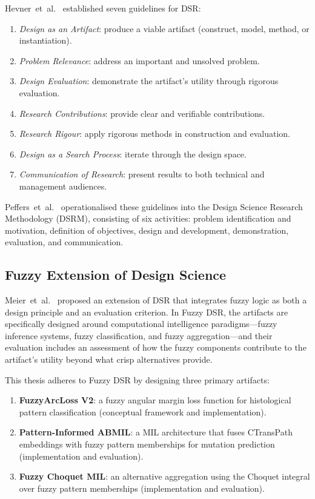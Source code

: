 Hevner~et~al.~\cite{hevner2004design} established seven guidelines for DSR:
\begin{enumerate}
    \item \textit{Design as an Artifact}: produce a viable artifact (construct, model, method, or instantiation).
    \item \textit{Problem Relevance}: address an important and unsolved problem.
    \item \textit{Design Evaluation}: demonstrate the artifact's utility through rigorous evaluation.
    \item \textit{Research Contributions}: provide clear and verifiable contributions.
    \item \textit{Research Rigour}: apply rigorous methods in construction and evaluation.
    \item \textit{Design as a Search Process}: iterate through the design space.
    \item \textit{Communication of Research}: present results to both technical and management audiences.
\end{enumerate}

Peffers~et~al.~\cite{peffers2007dsrm} operationalised these guidelines into the Design Science Research Methodology (DSRM), consisting of six activities: problem identification and motivation, definition of objectives, design and development, demonstration, evaluation, and communication.

\subsection{Fuzzy Extension of Design Science}
\label{sec:bg:fuzzy_dsr}

Meier~et~al.~\cite{meier2009fuzzy} proposed an extension of DSR that integrates fuzzy logic as both a design principle and an evaluation criterion.
In Fuzzy DSR, the artifacts are specifically designed around computational intelligence paradigms---fuzzy inference systems, fuzzy classification, and fuzzy aggregation---and their evaluation includes an assessment of how the fuzzy components contribute to the artifact's utility beyond what crisp alternatives provide.

This thesis adheres to Fuzzy DSR by designing three primary artifacts:
\begin{enumerate}
    \item \textbf{FuzzyArcLoss V2}: a fuzzy angular margin loss function for histological pattern classification (conceptual framework and implementation).
    \item \textbf{Pattern-Informed ABMIL}: a MIL architecture that fuses CTransPath embeddings with fuzzy pattern memberships for mutation prediction (implementation and evaluation).
    \item \textbf{Fuzzy Choquet MIL}: an alternative aggregation using the Choquet integral over fuzzy pattern memberships (implementation and evaluation).
\end{enumerate}

